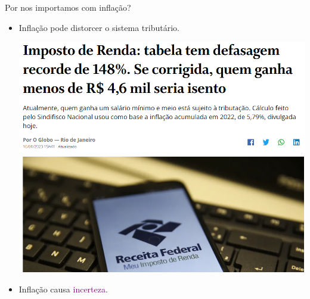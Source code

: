 \documentclass[10pt]{beamer}
\begin{document}
\begin{frame}{Por nos importamos com inflação?}
    \begin{itemize}
        \item Inflação pode distorcer o sistema tributário.
        \begin{center}
            \begin{minipage}[b]{.5\textwidth}
                \href{https://oglobo.globo.com/economia/imposto-de-renda/noticia/2023/01/imposto-de-renda-defasagem-na-tabela-atinge-148percent-e-chega-a-recorde-historico.ghtml}{\includegraphics[width=\textwidth]{./figures/irf.PNG}}
            \end{minipage}
        \end{center}
        \item Inflação causa \textcolor{purple}{incerteza}.
    \end{itemize}
\end{frame}
\end{document}
